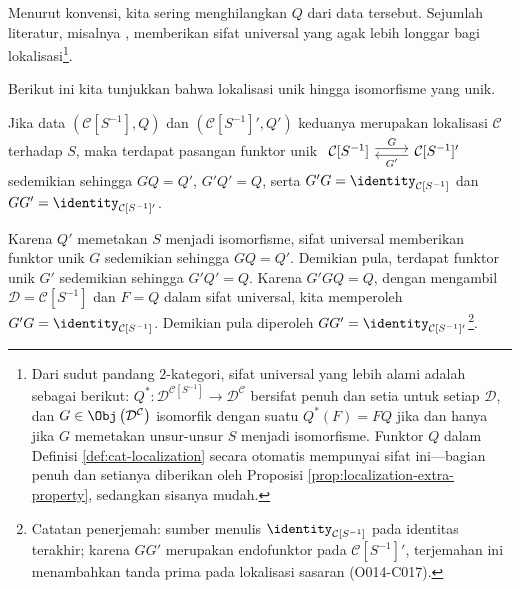 Menurut konvensi, kita sering menghilangkan $Q$ dari data tersebut. Sejumlah
literatur, misalnya \cite[Definisi 7.1.1]{KS06}, memberikan sifat universal
yang agak lebih longgar bagi lokalisasi\footnote{Dari sudut pandang
$2$-kategori, sifat universal yang lebih alami adalah sebagai berikut:
$Q^*: \mathcal{D}^{\mathcal{C}[S^{-1}]} \to \mathcal{D}^{\mathcal{C}}$
bersifat penuh dan setia untuk setiap $\mathcal{D}$, dan
$G \in \Obj\left(\mathcal{D}^{\mathcal{C}}\right)$ isomorfik dengan suatu
$Q^*(F) = FQ$ jika dan hanya jika $G$ memetakan unsur-unsur $S$ menjadi
isomorfisme. Funktor $Q$ dalam Definisi \ref{def:cat-localization} secara
	otomatis mempunyai sifat ini---bagian penuh dan setianya diberikan oleh
Proposisi \ref{prop:localization-extra-property}, sedangkan sisanya mudah.}.

Berikut ini kita tunjukkan bahwa lokalisasi unik hingga isomorfisme yang unik.

\begin{proposisi}\label{prop:cat-localization-unique}
	Jika data $(\mathcal{C}[S^{-1}], Q)$ dan
	$(\mathcal{C}[S^{-1}]', Q')$ keduanya merupakan lokalisasi $\mathcal{C}$
	terhadap $S$, maka terdapat pasangan funktor unik
	$\begin{tikzcd}
		\mathcal{C}[S^{-1}] \arrow[r, shift left, "G"] & \mathcal{C}[S^{-1}]' \arrow[l, shift left, "{G'}"]
	\end{tikzcd}$
	sedemikian sehingga $GQ = Q'$, $G'Q' = Q$, serta
	$G'G = \identity_{\mathcal{C}[S^{-1}]}$ dan
	$GG' = \identity_{\mathcal{C}[S^{-1}]'}$.
\end{proposisi}
\begin{bukti}
	Karena $Q'$ memetakan $S$ menjadi isomorfisme, sifat universal memberikan
	funktor unik $G$ sedemikian sehingga $GQ = Q'$. Demikian pula, terdapat
	funktor unik $G'$ sedemikian sehingga $G'Q' = Q$. Karena $G'GQ = Q$,
	dengan mengambil $\mathcal{D} = \mathcal{C}[S^{-1}]$ dan $F = Q$ dalam
	sifat universal, kita memperoleh
	$G'G = \identity_{\mathcal{C}[S^{-1}]}$. Demikian pula diperoleh
	$GG' = \identity_{\mathcal{C}[S^{-1}]'}$\footnote{Catatan penerjemah:
	sumber menulis $\identity_{\mathcal{C}[S^{-1}]}$ pada identitas terakhir;
	karena $GG'$ merupakan endofunktor pada $\mathcal{C}[S^{-1}]'$,
	terjemahan ini menambahkan tanda prima pada lokalisasi sasaran
	(O014-C017).}.
\end{bukti}

